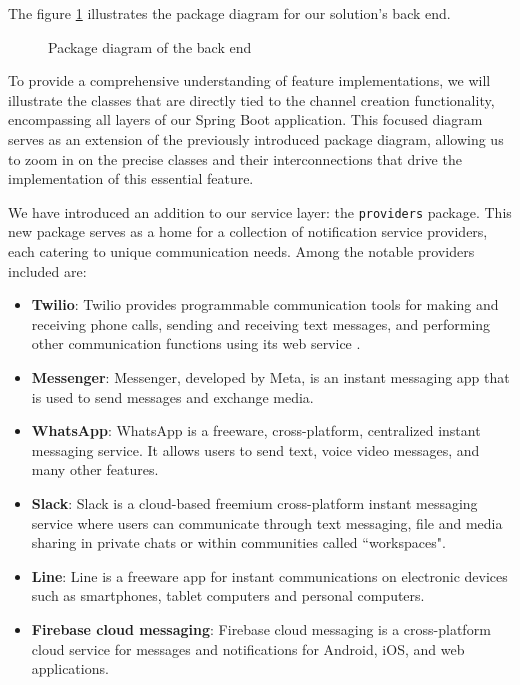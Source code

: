 \noindent The figure \ref{package-diagram} illustrates the package diagram for our solution's back end.

\newpage

\begin{figure}[hbt!]
    \centering
    
    \caption{Package diagram of the back end}
    \label{package-diagram}
\end{figure}

To provide a comprehensive understanding of feature implementations, we will illustrate the classes that
are directly tied to the channel creation functionality, encompassing all layers of our Spring Boot
application. This focused diagram serves as an extension of the previously introduced package diagram,
allowing us to zoom in on the precise classes and their interconnections that drive the implementation
of this essential feature.

We have introduced an addition to our service layer: the \texttt{providers} package. This new package
serves as a home for a collection of notification service providers, each catering to unique communication
needs. Among the notable providers included are:
\begin{itemize}
    \item \textbf{Twilio}: Twilio provides programmable communication tools for making and receiving
          phone calls, sending and receiving text messages, and performing other communication functions
          using its web service .
    \item \textbf{Messenger}: Messenger, developed by Meta, is an instant messaging app that is used
          to send messages and exchange media.
    \item \textbf{WhatsApp}: WhatsApp is a freeware, cross-platform, centralized instant messaging
          service. It allows users to send text, voice video messages, and many other features.
    \item \textbf{Slack}: Slack is a cloud-based freemium cross-platform instant messaging service
          where users can communicate through text messaging, file and media sharing in private chats or
          within communities called ``workspaces".
    \item \textbf{Line}: Line is a freeware app for instant communications on electronic devices
          such as smartphones, tablet computers and personal computers.
    \item \textbf{Firebase cloud messaging}:  Firebase cloud messaging is a cross-platform cloud service
          for messages and notifications for Android, iOS, and web applications.
\end{itemize}

